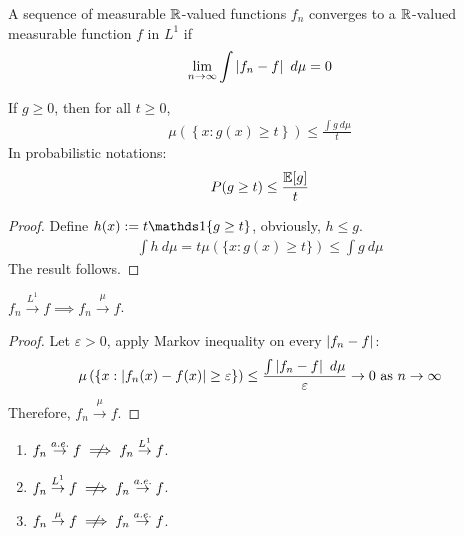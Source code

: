 \documentclass[11pt]{article}
\begin{document}
	\begin{definition}
		A sequence of measurable $\mathbb{R}$-valued functions $f_n$ converges to a $\mathbb{R}$-valued measurable function $f$ in $L^1$ if
		\begin{align}
			\lim_{n\to\infty} \int \left \vert {f_n - f} \right \vert\ d\mu = 0
		\end{align}
	\end{definition}
	
	\begin{proposition}
		If $g \geq 0$, then for all $t \geq 0$,
		\begin{align}
			\mu\left(\left\{x : g(x) \geq t \right\}\right) \leq \frac{\int g\ d\mu}{t}
		\end{align}
		In probabilistic notations:
		\begin{align}
			P(g \geq t) \leq \frac{\mathbb{E}[g]}{t}
		\end{align}
		\begin{proof}
			Define $h(x) := t \id{g \geq t}$, obviously, $h \leq g$.
			\begin{align}
				\int h\ d\mu = t \mu(\{x: g(x) \geq t\}) \leq \int g\ d\mu
			\end{align}
			The result follows.
		\end{proof}
	\end{proposition}
	
	\begin{proposition}
		$f_n \overset{L^1}{\to} f \implies f_n \overset{\mu}{\to} f$.
		\begin{proof}
			Let $\varepsilon > 0$, apply Markov inequality on every $\left \vert {f_n - f} \right \vert$:
			\begin{align}
				\mu\left(\left\{x : \left \vert {f_n(x) - f(x)} \right \vert \geq \varepsilon \right\}\right) \leq \frac{\int \left \vert {f_n - f} \right \vert\ d\mu}{\varepsilon} \to 0 \text{{ as }} n \to \infty
			\end{align}
			Therefore, $f_n \overset{\mu}{\to} f$.
		\end{proof}
	\end{proposition}
	\begin{remark} \quad
		\begin{enumerate}
			\item $f_n \overset{a.e.}{\to} f \centernot \implies f_n \overset{L^1}{\to} f$.
			\item $f_n \overset{L^1}{\to} f \centernot \implies f_n \overset{a.e.}{\to} f$.
			\item $f_n \overset{\mu}{\to} f \centernot \implies f_n \overset{a.e.}{\to} f$.
		\end{enumerate}
	\end{remark}
	
\end{document}
